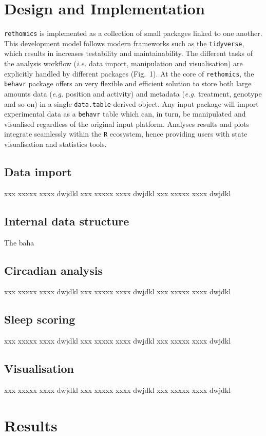 \documentclass[10pt,letterpaper]{article}
\begin{document}
\section*{Design and Implementation}

\texttt{rethomics} is implemented as a collection of small packages linked to one another.
This development model follows modern frameworks such as the \texttt{tidyverse}, which results in increases testability and maintainability.
The different tasks of the analysis workflow (\emph{i.e.} data import, manipulation and visualisation)
are explicitly handled by different packages (Fig.~1\vphantom{\ref{fig:01}}).
At the core of \texttt{rethomics}, the \texttt{behavr} package offers an very flexible and efficient solution to store both large amounts data (\emph{e.g.} position and activity) and metadata (\emph{e.g.} treatment, genotype and so on) in a single \texttt{data.table} derived object.
Any input package will import experimental data as a \texttt{behavr} table which can, in turn, be manipulated and visualised regardless of the original input platform.
Analyses results and plots integrate seamlessly within the \texttt{R} ecosystem, hence providing users with state visualisation and statistics tools.


\subsection{Data import}
xxx xxxxx xxxx dwjdkl xxx xxxxx xxxx dwjdkl xxx xxxxx xxxx dwjdkl 
\subsection{Internal data structure}
The baha
\subsection{Circadian analysis}
xxx xxxxx xxxx dwjdkl xxx xxxxx xxxx dwjdkl xxx xxxxx xxxx dwjdkl 
\subsection{Sleep scoring}
xxx xxxxx xxxx dwjdkl xxx xxxxx xxxx dwjdkl xxx xxxxx xxxx dwjdkl 
\subsection{Visualisation}
xxx xxxxx xxxx dwjdkl xxx xxxxx xxxx dwjdkl xxx xxxxx xxxx dwjdkl 


\section*{Results}
\end{document}
